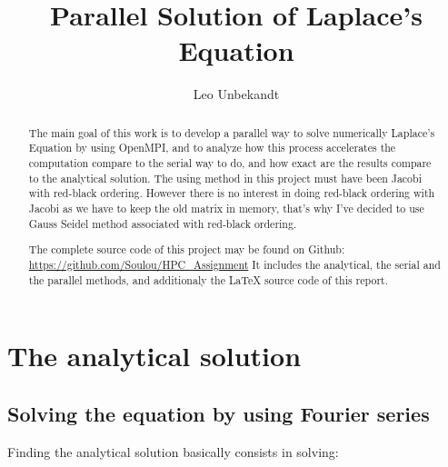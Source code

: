 \documentclass[a4paper,11pt]{article}
\title{Parallel Solution of Laplace's Equation}
\author{Leo Unbekandt}
\begin{document}
\maketitle
\tableofcontents

\begin{abstract}
  The main goal of this work is to develop a parallel way to solve numerically Laplace's Equation by using OpenMPI,
  and to analyze how this process accelerates the computation compare to the serial way to do, and how exact are the
  results compare to the analytical solution. The using method in this project must have been Jacobi with red-black
  ordering. However there is no interest in doing red-black ordering with Jacobi as we have to keep the old matrix in
  memory, that's why I've decided to use Gauss Seidel method associated with red-black ordering.
  
  The complete source code of this project may be found on Github: \url{https://github.com/Soulou/HPC_Assignment}
  It includes the analytical, the serial and the parallel methods, and additionaly the \LaTeX \hspace{5pt} source code of this
  report.
\end{abstract}

\section{The analytical solution}
\subsection{Solving the equation by using Fourier series}

Finding the analytical solution basically consists in solving:
\end{document}
